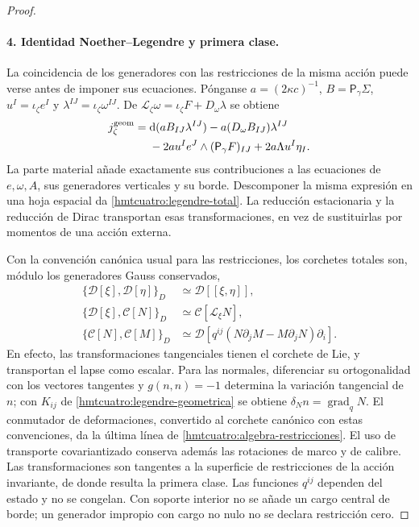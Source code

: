 \begin{proof}
\paragraph{4. Identidad Noether--Legendre y primera clase.}
La coincidencia de los generadores con las restricciones de la misma
acción puede verse antes de imponer sus ecuaciones.
Pónganse \(a=(2\kappa c)^{-1}\), \(B=\mathsf P_\gamma\Sigma\),
\(u^I=\iota_\zeta e^I\) y \(\lambda^{IJ}=\iota_\zeta\omega^{IJ}\).
De \(\mathcal L_\zeta\omega=\iota_\zeta F+D_\omega\lambda\) se obtiene
\begin{equation}
 \begin{split}
 j_\zeta^{\rm geom}
 ={}&\mathrm d(a B_{IJ}\lambda^{IJ})
   -a(D_\omega B_{IJ})\lambda^{IJ}\\
 &-2a u^Ie^J\wedge(\mathsf P_\gamma F)_{IJ}
       +2a\Lambda u^I\eta_I .
 \end{split}
 \label{hmtcuatro:noether-legendre}
\end{equation}
La parte material añade exactamente sus contribuciones a las
ecuaciones de \(e,\omega,A\), sus generadores verticales y su borde.
Descomponer la misma expresión en una hoja espacial da
\eqref{hmtcuatro:legendre-total}. La reducción estacionaria y la
reducción de Dirac transportan esas transformaciones, en vez de
sustituirlas por momentos de una acción externa.

Con la convención canónica usual para las restricciones, los corchetes
totales son, módulo los generadores Gauss conservados,
\begin{equation}
 \begin{aligned}
 \{\mathcal D[\xi],\mathcal D[\eta]\}_D
    &\simeq\mathcal D[[\xi,\eta]],\\
 \{\mathcal D[\xi],\mathcal C[N]\}_D
    &\simeq\mathcal C[\mathcal L_\xi N],\\
 \{\mathcal C[N],\mathcal C[M]\}_D
    &\simeq\mathcal D[
       q^{ij}(N\partial_jM-M\partial_jN)\partial_i].
 \end{aligned}
 \label{hmtcuatro:algebra-restricciones}
\end{equation}
En efecto, las transformaciones tangenciales tienen el corchete de
Lie, y transportan el lapse como escalar. Para las normales,
diferenciar su ortogonalidad con los vectores tangentes y
\(g(n,n)=-1\) determina la variación tangencial de \(n\);
con \(K_{ij}\) de \eqref{hmtcuatro:legendre-geometrica} se obtiene
\(\delta_N n=\operatorname{grad}_qN\). El conmutador de deformaciones,
convertido al corchete canónico con estas convenciones, da la última
línea de \eqref{hmtcuatro:algebra-restricciones}. El uso de transporte
covariantizado conserva además las rotaciones de marco y de calibre.
Las transformaciones son tangentes a la superficie de restricciones
de la acción invariante, de donde resulta la primera clase.
Las funciones \(q^{ij}\) dependen del estado y no se congelan.
Con soporte interior no se añade un cargo central de borde; un
generador impropio con cargo no nulo no se declara restricción cero.


\end{proof}

